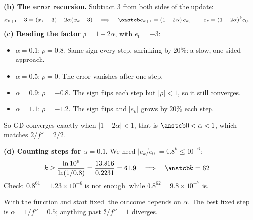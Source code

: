 \begin{frame}{}
  \textbf{(b) The error recursion.} Subtract $3$ from both sides of the update:
  \[
    x_{k+1} - 3 = (x_k - 3) - 2\alpha(x_k - 3)
    \quad\Longrightarrow\quad \ans{e_{k+1} = (1 - 2\alpha)\,e_k},
    \qquad e_k = (1-2\alpha)^k e_0 .
  \]
  \textbf{(c) Reading the factor} $\rho = 1 - 2\alpha$, with $e_0 = -3$:
  \begin{itemize}\small
    \item $\alpha = 0.1$: $\rho = 0.8$. Same sign every step, shrinking by $20\%$: a slow, one-sided approach.
    \item $\alpha = 0.5$: $\rho = 0$. The error vanishes after one step.
    \item $\alpha = 0.9$: $\rho = -0.8$. The sign flips each step but $|\rho| < 1$, so it still converges.
    \item $\alpha = 1.1$: $\rho = -1.2$. The sign flips and $|e_k|$ grows by $20\%$ each step.
  \end{itemize}
  So GD converges exactly when $|1 - 2\alpha| < 1$, that is $\ans{0 < \alpha < 1}$, which matches $2/f'' = 2/2$.
\end{frame}

\begin{frame}{}
  \textbf{(d) Counting steps for $\alpha = 0.1$.} We need $|e_k/e_0| = 0.8^k \le 10^{-6}$:
  \[
    k \ge \frac{\ln 10^{6}}{\ln(1/0.8)} = \frac{13.816}{0.2231} = 61.9
    \quad\Longrightarrow\quad \ans{k = 62}
  \]
  Check: $0.8^{61} = 1.23\times10^{-6}$ is not enough, while $0.8^{62} = 9.8\times10^{-7}$ is.
  \begin{keybox}
    With the function and start fixed, the outcome depends on $\alpha$.
    The best fixed step is $\alpha = 1/f'' = 0.5$; anything past $2/f'' = 1$ diverges.
  \end{keybox}
\end{frame}
